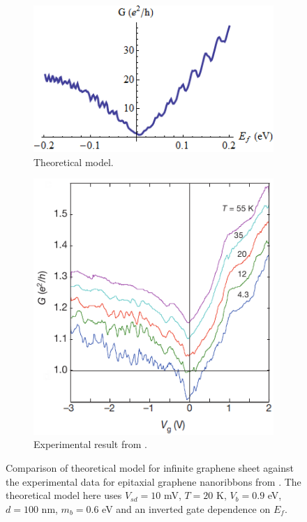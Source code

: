 		\begin{figure}
			\begin{subfigure}{0.45\textwidth}
				\centerline{\includegraphics[scale=0.5]{images/exp-a-4}}
				\caption{Theoretical model.}
			\end{subfigure}
			\hspace{1cm}
			\begin{subfigure}{0.45\textwidth}
				\centerline{\includegraphics[scale=0.5]{images/exp-pa-4}}
				\caption{Experimental result from \cite{b19}.}
			\end{subfigure}
			\caption{Comparison of theoretical model for infinite graphene sheet against the experimental data for epitaxial graphene nanoribbons from \cite{b19}. The theoretical model here uses $V_{sd}=10$ mV, $T=20$ K, $V_{b}=0.9$ eV, $d=100$ nm, $m_{b}=0.6$ eV and an inverted gate dependence on $E_{f}$.}
			\label{exp-pa-4}
		\end{figure}

